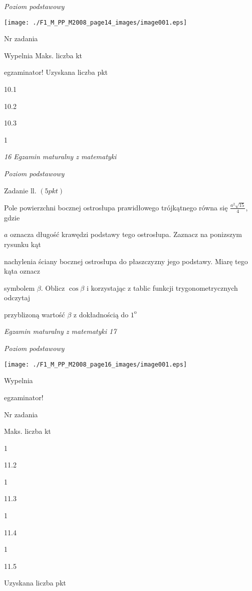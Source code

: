 \documentclass[a4paper,12pt]{article}
\begin{document}
{\it Poziom podstawowy}
\begin{center}
\texttt{[image: ./F1\_M\_PP\_M2008\_page14\_images/image001.eps]}
\end{center}
Nr zadania

Wypelnia Maks. liczba kt

egzaminator! Uzyskana liczba pkt

10.1

10.2

10.3

1





{\it 16 Egzamin maturalny z matematyki}

{\it Poziom podstawowy}

Zadanie ll. $(5pkt)$

Pole powierzchni bocznej ostrosłupa prawidłowego trójkątnego równa się $\displaystyle \frac{a^{2}\sqrt{15}}{4}$, gdzie

$a$ oznacza długość krawędzi podstawy tego ostrosłupa. Zaznacz na ponizszym rysunku kąt

nachylenia ściany bocznej ostrosłupa do płaszczyzny jego podstawy. Miarę tego kąta oznacz

symbolem $\beta$. Oblicz $\cos\beta$ i korzystając z tablic funkcji trygonometrycznych odczytaj

przyblizoną wartość $\beta$ z dokładnością do $1^{\mathrm{o}}$





{\it Egzamin maturalny z matematyki 17}

{\it Poziom podstawowy}
\begin{center}
\texttt{[image: ./F1\_M\_PP\_M2008\_page16\_images/image001.eps]}
\end{center}
Wypelnia

egzaminator!

Nr zadania

Maks. liczba kt

1

11.2

1

11.3

1

11.4

1

11.5

Uzyskana liczba pkt
\end{document}

